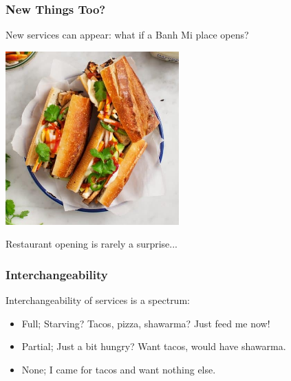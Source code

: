 \begin{frame}
\frametitle{New Things Too?}

New services can appear: what if a Banh Mi place opens?

\begin{center}
	\includegraphics[width=0.5\textwidth]{images/banh-mi.jpg}
\end{center}

Restaurant opening is rarely a surprise...


\end{frame}

\begin{frame}
\frametitle{Interchangeability}

Interchangeability of services is a spectrum:

\begin{itemize}
	\item Full; Starving? Tacos, pizza, shawarma? Just feed me now! \vspace{5em}
	\item Partial; Just a bit hungry? Want tacos, would have shawarma. \vspace{5em}
	\item None; I came for tacos and want nothing else.
\end{itemize}


\end{frame}


